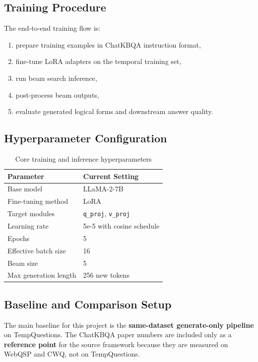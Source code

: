 \documentclass[a4paper,11pt]{article}
\begin{document}
\subsection{Training Procedure}

The end-to-end training flow is:

\begin{enumerate}[leftmargin=1.4cm]
  \item prepare training examples in ChatKBQA instruction format,
  \item fine-tune LoRA adapters on the temporal training set,
  \item run beam search inference,
  \item post-process beam outputs,
  \item evaluate generated logical forms and downstream answer quality.
\end{enumerate}

\subsection{Hyperparameter Configuration}

\begin{table}[H]
\centering
\caption{Core training and inference hyperparameters}
\begin{tabular}{p{6cm}p{6cm}}
\toprule
\textbf{Parameter} & \textbf{Current Setting} \\
\midrule
Base model & LLaMA-2-7B \\
Fine-tuning method & LoRA \\
Target modules & \texttt{q\_proj}, \texttt{v\_proj} \\
Learning rate & 5e-5 with cosine schedule \\
Epochs & 5 \\
Effective batch size & 16 \\
Beam size & 5 \\
Max generation length & 256 new tokens \\
\bottomrule
\end{tabular}
\end{table}

\subsection{Baseline and Comparison Setup}

The main baseline for this project is the \textbf{same-dataset generate-only pipeline} on TempQuestions. The ChatKBQA paper numbers are included only as a \textbf{reference point} for the source framework because they are measured on WebQSP and CWQ, not on TempQuestions.
\end{document}
